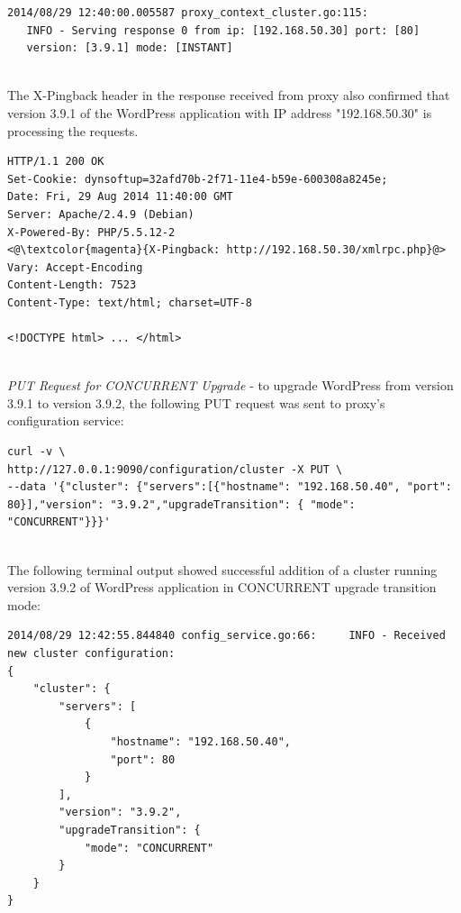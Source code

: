 \documentclass[a4paper,11pt,twoside]{report}
\begin{document}
\begin{lstlisting}[language=terminal]
2014/08/29 12:40:00.005587 proxy_context_cluster.go:115:     
   INFO - Serving response 0 from ip: [192.168.50.30] port: [80] 
   version: [3.9.1] mode: [INSTANT]
\end{lstlisting}  

\noindent\\
The X-Pingback header in the response received from proxy also confirmed that version 3.9.1 of the WordPress application with IP address "192.168.50.30" is processing the requests. \smallskip

\begin{lstlisting}[language=terminal]
HTTP/1.1 200 OK
Set-Cookie: dynsoftup=32afd70b-2f71-11e4-b59e-600308a8245e;
Date: Fri, 29 Aug 2014 11:40:00 GMT
Server: Apache/2.4.9 (Debian)
X-Powered-By: PHP/5.5.12-2
<@\textcolor{magenta}{X-Pingback: http://192.168.50.30/xmlrpc.php}@>
Vary: Accept-Encoding
Content-Length: 7523
Content-Type: text/html; charset=UTF-8
 
<!DOCTYPE html> ... </html>
\end{lstlisting} 

\noindent\\
\textit{PUT Request for CONCURRENT Upgrade} - to upgrade WordPress from version 3.9.1 to version 3.9.2, the following PUT request was sent to proxy's configuration service: \smallskip

\begin{lstlisting}[language=terminal]
curl -v \
http://127.0.0.1:9090/configuration/cluster -X PUT \
--data '{"cluster": {"servers":[{"hostname": "192.168.50.40", "port": 80}],"version": "3.9.2","upgradeTransition": { "mode": "CONCURRENT"}}}'
\end{lstlisting}  

\noindent\\
The following terminal output showed successful addition of a cluster running version 3.9.2 of WordPress application in CONCURRENT upgrade transition mode:\smallskip

\begin{lstlisting}[language=terminal]
2014/08/29 12:42:55.844840 config_service.go:66:     INFO - Received new cluster configuration:
{
    "cluster": {
        "servers": [
            {
                "hostname": "192.168.50.40", 
                "port": 80
            }
        ], 
        "version": "3.9.2", 
        "upgradeTransition": {
            "mode": "CONCURRENT"
        }
    }
} 
\end{lstlisting} 
\end{document}
